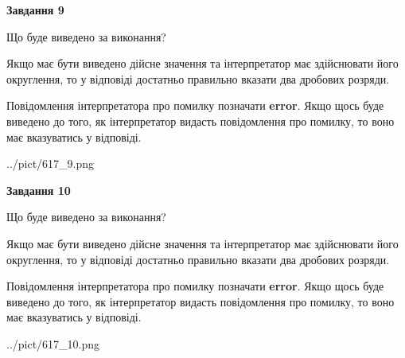 \documentclass[12pt, ukrainian]{article}
\begin{document}
{\begin {Large}
{\begin {center}\textbf{Завдання 9}\end {center}}\par
Що буде виведено за виконання? \par

Якщо має бути виведено дійсне значення та інтерпретатор має здійснювати його округлення, 
то у відповіді достатньо правильно вказати два дробових розряди.

Повідомлення інтерпретатора про помилку позначати \textbf{error}.
Якщо щось буде виведено до того, як інтерпретатор видасть повідомлення про помилку, 
то воно має вказуватись у відповіді. \par

\begin{center}
	{../pict/617_9.png}
\end{center}
\newpage

{\begin {center}\textbf{Завдання 10}\end {center}}\par
Що буде виведено за виконання? \par

Якщо має бути виведено дійсне значення та інтерпретатор має здійснювати його округлення, 
то у відповіді достатньо правильно вказати два дробових розряди.

Повідомлення інтерпретатора про помилку позначати \textbf{error}.
Якщо щось буде виведено до того, як інтерпретатор видасть повідомлення про помилку, 
то воно має вказуватись у відповіді. \par

\begin{center}
	{../pict/617_10.png}
\end{center}
\newpage

\end {Large}}
\end{document}

